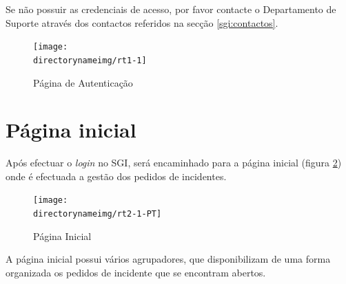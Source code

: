 Se não possuir as credenciais de acesso, por favor contacte o Departamento de Suporte através dos contactos referidos na secção \ref{sgi:contactos}.


\begin{figure}[H]
\begin{center}
\texttt{[image: \\directorynameimg/rt1-1]}
\end{center}
\caption{Página de Autenticação}
\label{fig:rt1}
\end{figure}

\section{Página inicial}
Após efectuar o \emph{login} no SGI, será encaminhado para a página inicial (figura \ref{fig:rt2}) onde é efectuada a gestão dos pedidos de incidentes.

\begin{figure}[H]
\begin{center}
\texttt{[image: \\directorynameimg/rt2-1-PT]}
\end{center}
\caption{Página Inicial}
\label{fig:rt2}
\end{figure}

A página inicial possui vários agrupadores, que disponibilizam de uma forma organizada os pedidos de incidente que se encontram abertos.

